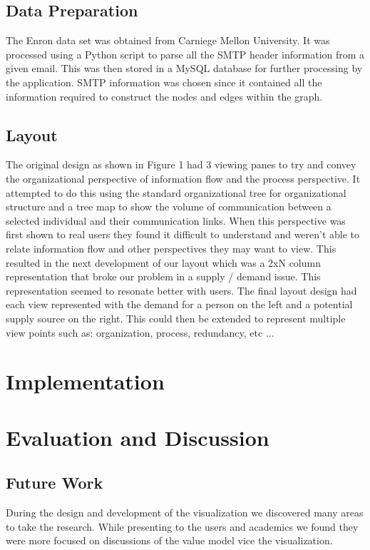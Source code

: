\documentclass[journal]{vgtc}                %
\begin{document}
\subsection{Data Preparation}

The Enron data set was obtained from Carniege Mellon University.  It was processed using a Python script to parse all the SMTP header information from a given email.  This was then stored in a MySQL database for further processing by the application.  SMTP information was chosen since it contained all the information required to construct the nodes and edges within the graph.  

\subsection{Layout}
The original design as shown in Figure 1 had 3 viewing panes to try and convey the organizational perspective of information flow and the process perspective.  It attempted to do this using the standard organizational tree for organizational structure and a tree map to show the volume of communication between a selected individual and their communication links.  When this perspective was first shown to real users they found it difficult to understand and weren't able to relate information flow and other perspectives they may want to view.  This resulted in the next development of our layout which was a 2xN column representation that broke our problem in a supply / demand issue.  This representation seemed to resonate better with users.  The final layout design had each view represented with the demand for a person on the left and a potential supply source on the right.  This could then be extended to represent multiple view points such as: organization, process, redundancy, etc ...

\section{Implementation}

\section{Evaluation and Discussion}

\subsection{Future Work}
During the design and development of the visualization we discovered many areas to take the research.  While presenting to the users and academics we found they were more focused on discussions of the value model vice the visualization.
\end{document}
